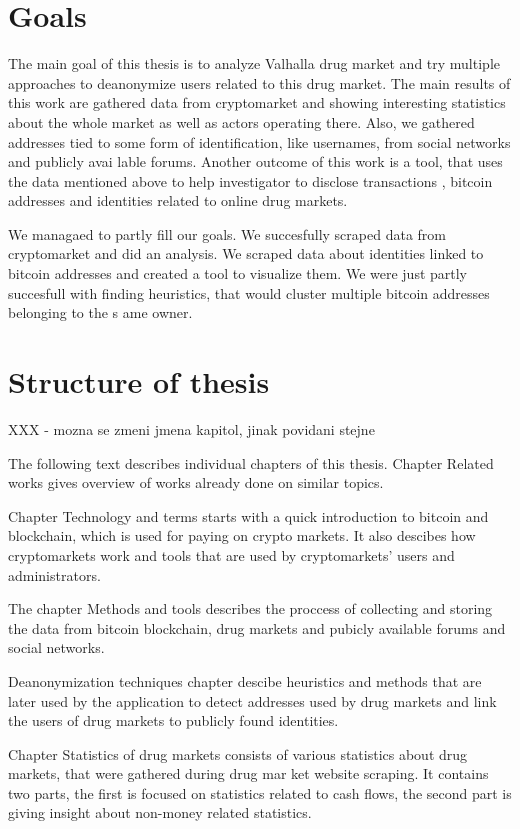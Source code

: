 \documentclass[
  digital, %
  table,   %
  lof,     %
  lot,     %
  oneside
]{fithesis3}
\begin{document}
\section{Goals}

The main goal of this thesis is to analyze Valhalla drug market
and try multiple approaches to deanonymize users related to this drug market.
The main results of this work are gathered data from cryptomarket and
 showing interesting statistics about the whole market as well as actors operating there.
 Also, we gathered addresses tied to some form of identification, like usernames, from social networks and publicly avai
lable forums.
Another outcome of this work is a tool, that uses the data mentioned above to help investigator to disclose transactions
,
bitcoin addresses and identities related to online drug markets.

We managaed to partly fill our goals. We succesfully scraped data from cryptomarket and did an analysis.
We scraped data about identities linked to bitcoin addresses and created a tool to visualize them.
We were just partly succesfull with finding heuristics, that would cluster multiple bitcoin addresses belonging to the s
ame owner.

\section{Structure of thesis}
XXX - mozna se zmeni jmena kapitol, jinak povidani stejne

The following text describes individual chapters of this thesis.
Chapter Related works gives overview of works already done on similar topics. 

Chapter Technology and terms starts with a quick introduction to bitcoin and blockchain,
which is used for paying on crypto markets.
It also descibes how cryptomarkets work and tools that are used by cryptomarkets' users and administrators.

The chapter Methods and tools describes the proccess of collecting and storing the data from bitcoin blockchain,
drug markets and pubicly available forums and social networks. 

Deanonymization techniques chapter descibe heuristics and methods that are later used by the application to detect 
addresses used by drug markets and link the users of drug markets to publicly found identities.

Chapter Statistics of drug markets consists of various statistics about drug markets, that were gathered during drug mar
ket website scraping.
It contains two parts, the first is focused on statistics related to cash flows, the second part is giving insight about
 non-money related statistics.
\end{document}
